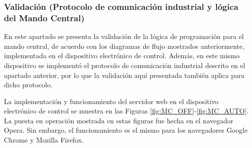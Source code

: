 \subsubsection{Validación (Protocolo de comunicación industrial y lógica del Mando Central)}

En este apartado se presenta la validación de la lógica de programación para el mando central, de acuerdo con los diagramas de flujo mostrados anteriormente, implementada en el dispositivo electrónico de control. Además, en este mismo dispositivo se implementó el protocolo de comunicación industrial descrito en el apartado anterior, por lo que la validación aquí presentada también aplica para dicho protocolo.

La implementación y funcionamiento del servidor web en el dispositivo electrónico de control se muestra en las Figuras \ref{fig:MC_OFF}-\ref{fig:MC_AUTO}. La puesta en operación mostrada en estas figuras fue hecha en el navegador Opera. Sin embargo, el funcionamiento es el mismo para los navegadores Google Chrome y Mozilla Firefox.

